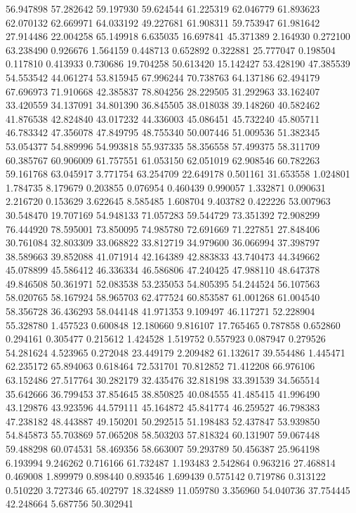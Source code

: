 56.947898
57.282642
59.197930
59.624544
61.225319
62.046779
61.893623
62.070132
62.669971
64.033192
49.227681
61.908311
59.753947
61.981642
27.914486
22.004258
65.149918
6.635035
16.697841
45.371389
2.164930
0.272100
63.238490
0.926676
1.564159
0.448713
0.652892
0.322881
25.777047
0.198504
0.117810
0.413933
0.730686
19.704258
50.613420
15.142427
53.428190
47.385539
54.553542
44.061274
53.815945
67.996244
70.738763
64.137186
62.494179
67.696973
71.910668
42.385837
78.804256
28.229505
31.292963
33.162407
33.420559
34.137091
34.801390
36.845505
38.018038
39.148260
40.582462
41.876538
42.824840
43.017232
44.336003
45.086451
45.732240
45.805711
46.783342
47.356078
47.849795
48.755340
50.007446
51.009536
51.382345
53.054377
54.889996
54.993818
55.937335
58.356558
57.499375
58.311709
60.385767
60.906009
61.757551
61.053150
62.051019
62.908546
60.782263
59.161768
63.045917
3.771754
63.254709
22.649178
0.501161
31.653558
1.024801
1.784735
8.179679
0.203855
0.076954
0.460439
0.990057
1.332871
0.090631
2.216720
0.153629
3.622645
8.585485
1.608704
9.403782
0.422226
53.007963
30.548470
19.707169
54.948133
71.057283
59.544729
73.351392
72.908299
76.444920
78.595001
73.850095
74.985780
72.691669
71.227851
27.848406
30.761084
32.803309
33.068822
33.812719
34.979600
36.066994
37.398797
38.589663
39.852088
41.071914
42.164389
42.883833
43.740473
44.349662
45.078899
45.586412
46.336334
46.586806
47.240425
47.988110
48.647378
49.846508
50.361971
52.083538
53.235053
54.805395
54.244524
56.107563
58.020765
58.167924
58.965703
62.477524
60.853587
61.001268
61.004540
58.356728
36.436293
58.044148
41.971353
9.109497
46.117271
52.228904
55.328780
1.457523
0.600848
12.180660
9.816107
17.765465
0.787858
0.652860
0.294161
0.305477
0.215612
1.424528
1.519752
0.557923
0.087947
0.279526
54.281624
4.523965
0.272048
23.449179
2.209482
61.132617
39.554486
1.445471
62.235172
65.894063
0.618464
72.531701
70.812852
71.412208
66.976106
63.152486
27.517764
30.282179
32.435476
32.818198
33.391539
34.565514
35.642666
36.799453
37.854645
38.850825
40.084555
41.485415
41.996490
43.129876
43.923596
44.579111
45.164872
45.841774
46.259527
46.798383
47.238182
48.443887
49.150201
50.292515
51.198483
52.437847
53.939850
54.845873
55.703869
57.065208
58.503203
57.818324
60.131907
59.067448
59.488298
60.074531
58.469356
58.663007
59.293789
50.456387
25.964198
6.193994
9.246262
0.716166
61.732487
1.193483
2.542864
0.963216
27.468814
0.469008
1.899979
0.898440
0.893546
1.699439
0.575142
0.719786
0.313122
0.510220
3.727346
65.402797
18.324889
11.059780
3.356960
54.040736
37.754445
42.248664
5.687756
50.302941
